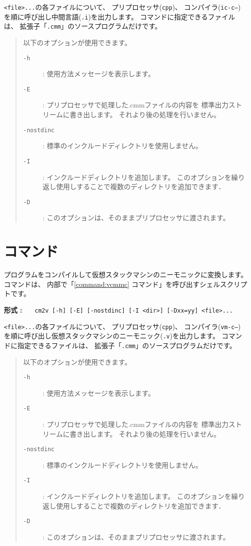 {\tt <file>...}の各ファイルについて、
プリプロセッサ({\tt cpp})、
コンパイラ({\tt ic-c--})
を順に呼び出し中間言語({\tt .i})を出力します。
{\cmi}コマンドに指定できるファイルは、
拡張子「{\tt .cmm}」の{\cmml}ソースプログラムだけです。

\begin{quote}
\hspace{-1em}以下のオプションが使用できます。

\begin{description}
\item[{\tt -h}] : 使用方法メッセージを表示します。
\item[{\tt -E}] : プリプロセッサで処理した{.cmm}ファイルの内容を
標準出力ストリームに書き出します。
それより後の処理を行いません。
\item[{\tt -nostdinc}] : 標準のインクルードディレクトリを使用しません。
\item[{\tt -I}] : インクルードディレクトリを追加します。
このオプションを繰り返し使用しすることで複数のディレクトリを追加できます．
\item[{\tt -D}] : このオプションは、そのままプリプロセッサに渡されます。
\end{description}
\end{quote}

\section{{\cmv}コマンド}

{\cmm}プログラムをコンパイルして仮想スタックマシンのニーモニックに変換します。
{\cmv}コマンドは、
内部で「\ref{command:vcmmc} {\vcmmc}コマンド」を呼び出すシェルスクリプトです。

\begin{flushleft}
{\bf 形式 : }~~~\verb/cm2v [-h] [-E] [-nostdinc] [-I <dir>] [-Dxx=yy] <file>.../
\end{flushleft}

{\tt <file>...}の各ファイルについて、
プリプロセッサ({\tt cpp})、
コンパイラ({\tt vm-c--})
を順に呼び出し仮想スタックマシンのニーモニック({\tt .v})を出力します。
{\cmv}コマンドに指定できるファイルは、
拡張子「{\tt .cmm}」の{\cmml}ソースプログラムだけです。

\begin{quote}
\hspace{-1em}以下のオプションが使用できます。

\begin{description}
\item[{\tt -h}] : 使用方法メッセージを表示します。
\item[{\tt -E}] : プリプロセッサで処理した{.cmm}ファイルの内容を
標準出力ストリームに書き出します。
それより後の処理を行いません。
\item[{\tt -nostdinc}] : 標準のインクルードディレクトリを使用しません。
\item[{\tt -I}] : インクルードディレクトリを追加します。
このオプションを繰り返し使用しすることで複数のディレクトリを追加できます．
\item[{\tt -D}] : このオプションは、そのままプリプロセッサに渡されます。
\end{description}
\end{quote}

